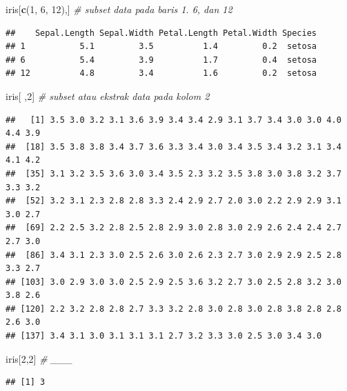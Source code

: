 \documentclass[]{article}
\newenvironment{Shaded}{\begin{snugshade}}{\end{snugshade}}
\newcommand{\CommentTok}[1]{\textcolor[rgb]{0.56,0.35,0.01}{\textit{#1}}}
\newcommand{\DecValTok}[1]{\textcolor[rgb]{0.00,0.00,0.81}{#1}}
\newcommand{\KeywordTok}[1]{\textcolor[rgb]{0.13,0.29,0.53}{\textbf{#1}}}
\newcommand{\NormalTok}[1]{#1}
\newcommand{\OperatorTok}[1]{\textcolor[rgb]{0.81,0.36,0.00}{\textbf{#1}}}
\begin{document}
\begin{Shaded}
\begin{Highlighting}[]
\NormalTok{iris[}\KeywordTok{c}\NormalTok{(}\DecValTok{1}\NormalTok{, }\DecValTok{6}\NormalTok{, }\DecValTok{12}\NormalTok{),] }\CommentTok{# subset data pada baris 1. 6, dan 12}
\end{Highlighting}
\end{Shaded}

\begin{verbatim}
##    Sepal.Length Sepal.Width Petal.Length Petal.Width Species
## 1           5.1         3.5          1.4         0.2  setosa
## 6           5.4         3.9          1.7         0.4  setosa
## 12          4.8         3.4          1.6         0.2  setosa
\end{verbatim}

\begin{Shaded}
\begin{Highlighting}[]
\NormalTok{iris[ ,}\DecValTok{2}\NormalTok{] }\CommentTok{# subset atau ekstrak data pada kolom 2}
\end{Highlighting}
\end{Shaded}

\begin{verbatim}
##   [1] 3.5 3.0 3.2 3.1 3.6 3.9 3.4 3.4 2.9 3.1 3.7 3.4 3.0 3.0 4.0 4.4 3.9
##  [18] 3.5 3.8 3.8 3.4 3.7 3.6 3.3 3.4 3.0 3.4 3.5 3.4 3.2 3.1 3.4 4.1 4.2
##  [35] 3.1 3.2 3.5 3.6 3.0 3.4 3.5 2.3 3.2 3.5 3.8 3.0 3.8 3.2 3.7 3.3 3.2
##  [52] 3.2 3.1 2.3 2.8 2.8 3.3 2.4 2.9 2.7 2.0 3.0 2.2 2.9 2.9 3.1 3.0 2.7
##  [69] 2.2 2.5 3.2 2.8 2.5 2.8 2.9 3.0 2.8 3.0 2.9 2.6 2.4 2.4 2.7 2.7 3.0
##  [86] 3.4 3.1 2.3 3.0 2.5 2.6 3.0 2.6 2.3 2.7 3.0 2.9 2.9 2.5 2.8 3.3 2.7
## [103] 3.0 2.9 3.0 3.0 2.5 2.9 2.5 3.6 3.2 2.7 3.0 2.5 2.8 3.2 3.0 3.8 2.6
## [120] 2.2 3.2 2.8 2.8 2.7 3.3 3.2 2.8 3.0 2.8 3.0 2.8 3.8 2.8 2.8 2.6 3.0
## [137] 3.4 3.1 3.0 3.1 3.1 3.1 2.7 3.2 3.3 3.0 2.5 3.0 3.4 3.0
\end{verbatim}

\begin{Shaded}
\begin{Highlighting}[]
\NormalTok{iris[}\DecValTok{2}\NormalTok{,}\DecValTok{2}\NormalTok{] }\CommentTok{# ___}
\end{Highlighting}
\end{Shaded}

\begin{verbatim}
## [1] 3
\end{verbatim}

\begin{Shaded}
\end{Shaded}
\end{document}

